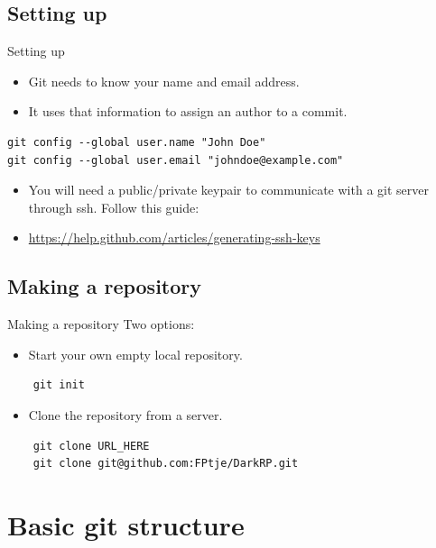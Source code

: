 \documentclass[10pt,a4paper]{beamer}
\begin{document}
\subsection{Setting up}
\begin{frame}[fragile]{Setting up}
\begin{itemize}
\item Git needs to know your name and email address.
\item It uses that information to assign an author to a commit.
\end{itemize}

\begin{verbatim}
git config --global user.name "John Doe"
git config --global user.email "johndoe@example.com"
\end{verbatim}

\begin{itemize}
\item You will need a public/private keypair to communicate with a git server through ssh. Follow this guide:
\item \url{https://help.github.com/articles/generating-ssh-keys}
\end{itemize}
\end{frame}

\subsection{Making a repository}
\begin{frame}[fragile]{Making a repository}
Two options:

\begin{itemize}
\item Start your own empty local repository.
\end{itemize}

	\begin{verbatim}
	git init
	\end{verbatim}

\begin{itemize}
\item Clone the repository from a server.
\end{itemize}

	\begin{verbatim}
	git clone URL_HERE
	git clone git@github.com:FPtje/DarkRP.git
	\end{verbatim}
\end{frame}


\section{Basic git structure}
\end{document}
